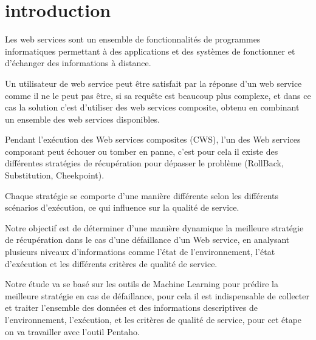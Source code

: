 \vspace{1cm}


\section{introduction}

Les web services sont un ensemble de fonctionnalités de programmes informatiques permettant à des applications et des systèmes de fonctionner et d'échanger des informations à distance.

Un utilisateur de web service peut être satisfait par la réponse d’un web service comme il ne le peut pas être, si sa requête est beaucoup plus complexe, et dans ce cas la solution c’est d’utiliser des web services composite, obtenu en combinant un ensemble des web services disponibles.

Pendant l'exécution des Web services composites (CWS), l’un des Web services composant peut échouer ou tomber en panne, c’est pour cela il existe des différentes stratégies de récupération pour dépasser le problème (RollBack, Substitution, Cheekpoint).

Chaque stratégie se comporte d’une manière différente selon les différents scénarios d’exécution, ce qui influence sur la qualité de service.

Notre objectif est de déterminer d’une manière dynamique  la meilleure stratégie de récupération  dans le cas d’une défaillance d’un Web service, en analysant  plusieurs niveaux d'informations comme l’état de l'environnement, l’état d'exécution et les différents critères de qualité de service.

Notre étude va se basé sur les outils de Machine Learning pour prédire la meilleure stratégie en cas de défaillance, pour cela il est indispensable de collecter et traiter l’ensemble des données et des informations descriptives de l’environnement, l’exécution, et les critères de qualité de service, pour cet étape on va travailler avec l’outil Pentaho.
